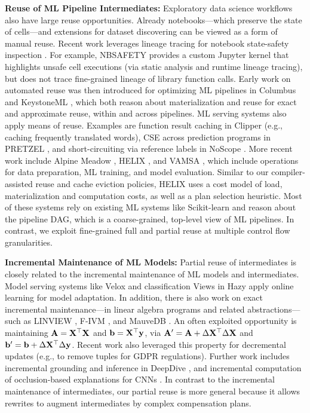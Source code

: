 \textbf{Reuse of ML Pipeline Intermediates:} Exploratory data science workflows also have large reuse opportunities. Already notebooks---which preserve the state of cells---and extensions for dataset discovering \cite{ZhangI19} can be viewed as a form of manual reuse. Recent work leverages lineage tracing for notebook state-safety inspection \cite{nbsafety21, BrachmannSKGMCB20}. For example, NBSAFETY \cite{nbsafety21} provides a custom Jupyter kernel that highlights unsafe cell executions (via static analysis and runtime lineage tracing), but does not trace fine-grained lineage of library function calls. Early work on automated reuse was then introduced for optimizing ML pipelines in Columbus \cite{ZhangKR14} and KeystoneML \cite{SparksVKFR17}, which both reason about materialization and reuse for exact and approximate reuse, within and across pipelines. ML serving systems also apply means of reuse. Examples are function result caching in Clipper \cite{CrankshawWZFGS17} (e.g., caching frequently translated words), CSE across prediction programs in PRETZEL \cite{LeeSCSWI18}, and short-circuiting via reference labels in NoScope \cite{KangEABZ17}. More recent work include Alpine Meadow \cite{ShangZBKECBUK19}, HELIX \cite{XinMMLSP18}, and VAMSA \cite{NamakiFPKAWZW20}, which include operations for data preparation, ML training, and model evaluation. Similar to our compiler-assisted reuse and cache eviction policies, HELIX uses a cost model of load, materialization and computation costs, as well as a plan selection heuristic. Most of these systems rely on existing ML systems like Scikit-learn \cite{PedregosaVGMTGBPWDVPCBPD11} and reason about the pipeline DAG, which is a coarse-grained, top-level view of ML pipelines. In contrast, we exploit fine-grained full and partial reuse at multiple control flow granularities.

\textbf{Incremental Maintenance of ML Models:} Partial reuse of intermediates is closely related to the incremental maintenance of ML models and intermediates. Model serving systems like Velox \cite{CrankshawBGLZFG15} and classification Views in Hazy \cite{KocR11} apply online learning for model adaptation. In addition, there is also work on exact incremental maintenance---in linear algebra programs and related abstractions---such as LINVIEW \cite{NikolicEK14}, F-IVM \cite{NikolicO18}, and MauveDB \cite{DeshpandeM06}. An often exploited opportunity is maintaining $\mathbf{A} = \mathbf{X}^{\top}\mathbf{X}$ and $\mathbf{b}=\mathbf{X}^{\top}\mathbf{y}$, via $\mathbf{A}^{\prime} = \mathbf{A} + \Delta\mathbf{X}^{\top}\Delta\mathbf{X}$ and $\mathbf{b}^{\prime} = \mathbf{b} + \Delta\mathbf{X}^{\top}\Delta\mathbf{y}$. Recent work also leveraged this property for decremental updates \cite{Schelter20} (e.g., to remove tuples for GDPR regulations). Further work includes incremental grounding and inference in DeepDive \cite{ShinWWSZR15}, and incremental computation of occlusion-based explanations for CNNs \cite{NakandalaKP19,rh/Nakandala20}. In contrast to the incremental maintenance of intermediates, our partial reuse is more general because it allows rewrites to augment intermediates by complex compensation plans.

